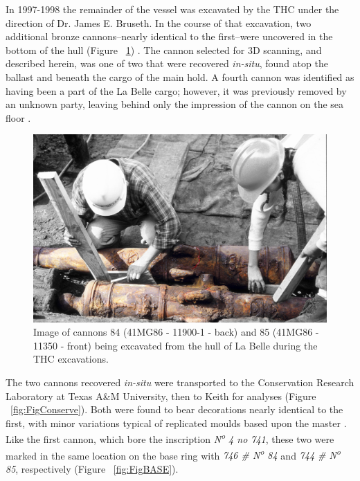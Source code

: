 \documentclass[review]{elsarticle}
\begin{document}
In 1997-1998 the remainder of the vessel was excavated by the THC under the direction of Dr. James E. Bruseth. In the course of that excavation, two additional bronze cannons--nearly identical to the first--were uncovered in the bottom of the hull (Figure ~\ref{fig:FigExcavate}) \citep{RN5763,RN5762,RN5761}. The cannon selected for 3D scanning, and described herein, was one of two that were recovered \textit{in-situ}, found atop the ballast and beneath the cargo of the main hold. A fourth cannon was identified as having been a part of the La Belle cargo; however, it was previously removed by an unknown party, leaving behind only the impression of the cannon on the sea floor \citep{RN5763}.

\begin{figure}[ht]\centering
\includegraphics[width=\linewidth]{FigExcavate2}
\caption{Image of cannons 84 (41MG86 - 11900-1 - back) and 85 (41MG86 - 11350 - front) being excavated from the hull of La Belle during the THC excavations.}
\label{fig:FigExcavate}
\end{figure}

The two cannons recovered \textit{in-situ} were transported to the Conservation Research Laboratory at Texas A\&M University, then to Keith for analyses (Figure ~\ref{fig:FigConserve}). Both were found to bear decorations nearly identical to the first, with minor variations typical of replicated moulds based upon the master \citep[361]{RN5763}. Like the first cannon, which bore the inscription \textit{N\textsuperscript{o} 4 no 741}, these two were marked in the same location on the base ring with \textit{746 \# N\textsuperscript{o} 84} and \textit{744 \# N\textsuperscript{o} 85}, respectively (Figure ~\ref{fig:FigBASE}).
\end{document}
